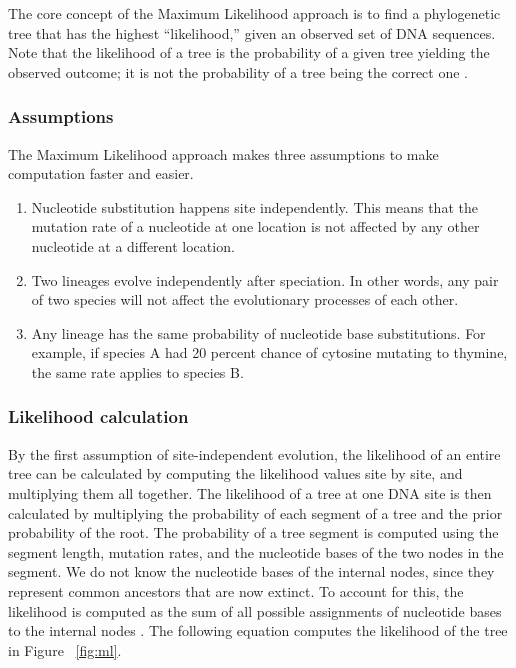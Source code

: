 \documentclass[10pt,twocolumn]{article}
\begin{document}
The core concept of the Maximum Likelihood approach is to find a phylogenetic tree that has the highest ``likelihood,'' given an observed set of DNA sequences. Note that the likelihood of a tree is the probability of a given tree yielding the observed outcome; it is not the probability of a tree being the correct one \cite{felsenstein1981evolutionary}.
 
\subsubsection*{Assumptions}
The Maximum Likelihood approach makes three assumptions to make computation faster and easier.
\begin{enumerate}
  \item Nucleotide substitution happens site independently. This means that the mutation rate of a nucleotide at one location is not affected by any other nucleotide at a different location. 
  \item Two lineages evolve independently after speciation. In other words, any pair of two species will not affect the evolutionary processes of each other.
  \item Any lineage has the same probability of nucleotide base substitutions. For example, if species A had 20 percent chance of cytosine mutating to thymine, the same rate applies to species B.
\end{enumerate}

\subsubsection*{Likelihood calculation}
By the first assumption of site-independent evolution, the likelihood
of an entire tree can be calculated by computing the likelihood values
site by site, and multiplying them all together. The likelihood of a
tree at one DNA site is then calculated by multiplying the probability
of each segment of a tree and the prior probability of the root. The
probability of a tree segment is computed using the segment length,
mutation rates, and the nucleotide bases of the two nodes in the
segment. We do not know the nucleotide bases of the internal nodes,
since they represent common ancestors that are now extinct. To account
for this, the likelihood is computed as the sum of all possible
assignments of nucleotide bases to the internal nodes
\cite{felsenstein1981evolutionary}. The following equation computes
the likelihood of the tree in Figure ~\ref{fig:ml}.
\end{document}
